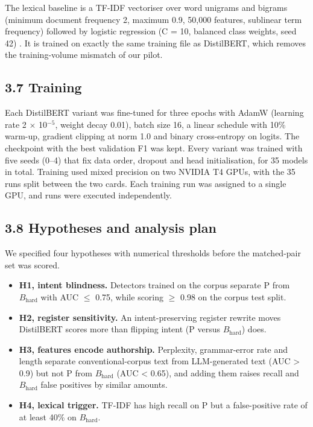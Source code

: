 \documentclass[11pt,letterpaper]{article}
\begin{document}
The lexical baseline is a TF-IDF vectoriser over word unigrams and bigrams (minimum document frequency 2, maximum 0.9, 50,000 features, sublinear term frequency) followed by logistic regression (C = 10, balanced class weights, seed 42) \cite{pedregosa2011}. It is trained on exactly the same training file as DistilBERT, which removes the training-volume mismatch of our pilot.

\subsection{3.7 Training}

Each DistilBERT variant was fine-tuned for three epochs with AdamW \cite{loshchilov2019} (learning rate 2 $\times$ 10$^{-5}$, weight decay 0.01), batch size 16, a linear schedule with 10\% warm-up, gradient clipping at norm 1.0 and binary cross-entropy on logits. The checkpoint with the best validation F1 was kept. Every variant was trained with five seeds (0--4) that fix data order, dropout and head initialisation, for 35 models in total. Training used mixed precision on two NVIDIA T4 GPUs, with the 35 runs split between the two cards. Each training run was assigned to a single GPU, and runs were executed independently.

\subsection{3.8 Hypotheses and analysis plan}

We specified four hypotheses with numerical thresholds before the matched-pair set was scored.

\begin{itemize}
\item \textbf{H1, intent blindness.} Detectors trained on the corpus separate P from $B_{\mathrm{hard}}$ with AUC $\leq$ 0.75, while scoring $\geq$ 0.98 on the corpus test split.
\item \textbf{H2, register sensitivity.} An intent-preserving register rewrite moves DistilBERT scores more than flipping intent (P versus $B_{\mathrm{hard}}$) does.
\item \textbf{H3, features encode authorship.} Perplexity, grammar-error rate and length separate conventional-corpus text from LLM-generated text (AUC > 0.9) but not P from $B_{\mathrm{hard}}$ (AUC < 0.65), and adding them raises recall and $B_{\mathrm{hard}}$ false positives by similar amounts.
\item \textbf{H4, lexical trigger.} TF-IDF has high recall on P but a false-positive rate of at least 40\% on $B_{\mathrm{hard}}$.
\end{itemize}
\end{document}

